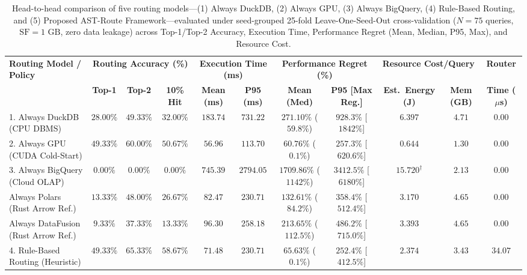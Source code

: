 \documentclass[10pt,a4paper]{article}
\begin{document}
\begin{table}[!t]
\centering
\caption{Head-to-head comparison of five routing models---(1) Always DuckDB, (2) Always GPU, (3) Always BigQuery, (4) Rule-Based Routing, and (5) Proposed AST-Route Framework---evaluated under seed-grouped 25-fold Leave-One-Seed-Out cross-validation ($N=75$ queries, $\text{SF}=1\text{ GB}$, zero data leakage) across Top-1/Top-2 Accuracy, Execution Time, Performance Regret (Mean, Median, P95, Max), and Resource Cost.}
\label{tab:routing_evaluation}\label{tab:query_routing}\label{tab:router_eval}
\scriptsize
\setlength{\tabcolsep}{3.2pt}
\renewcommand{\arraystretch}{1.12}
\begin{tabular}{@{}lcccccccccc@{}}
\toprule
\multirow{2}{*}{\textbf{Routing Model / Policy}} & \multicolumn{3}{c}{\textbf{Routing Accuracy (\%)}} & \multicolumn{2}{c}{\textbf{Execution Time (ms)}} & \multicolumn{2}{c}{\textbf{Performance Regret (\%)}} & \multicolumn{2}{c}{\textbf{Resource Cost/Query}} & \textbf{Router} \\
\cmidrule(lr){2-4} \cmidrule(lr){5-6} \cmidrule(lr){7-8} \cmidrule(lr){9-10} \cmidrule(lr){11-11}
 & \textbf{Top-1} & \textbf{Top-2} & \textbf{10\% Hit} & \textbf{Mean (ms)} & \textbf{P95 (ms)} & \textbf{Mean (Med)} & \textbf{P95 [Max Reg.]} & \textbf{Est.\ Energy (J)} & \textbf{Mem (GB)} & \textbf{Time ($\mu$s)} \\
\midrule
1. Always DuckDB (CPU DBMS) & $28.00\%$ & $49.33\%$ & $32.00\%$ & $183.74$ & $731.22$ & $271.10\%$ ($59.8\%$) & $928.3\%$ [$1842\%$] & $6.397$ & $4.71$ & $0.00$ \\
2. Always GPU (CUDA Cold-Start) & $49.33\%$ & $60.00\%$ & $50.67\%$ & $56.96$ & $113.70$ & $60.76\%$ ($0.1\%$) & $257.3\%$ [$620.6\%$] & $0.644$ & $1.30$ & $0.00$ \\
3. Always BigQuery (Cloud OLAP) & $0.00\%$ & $0.00\%$ & $0.00\%$ & $745.39$ & $2794.05$ & $1709.86\%$ ($1142\%$) & $3412.5\%$ [$6180\%$] & $15.720^{\dagger}$ & $2.13$ & $0.00$ \\
Always Polars (Rust Arrow Ref.) & $13.33\%$ & $48.00\%$ & $26.67\%$ & $82.47$ & $230.71$ & $132.61\%$ ($84.2\%$) & $358.4\%$ [$512.4\%$] & $3.170$ & $4.65$ & $0.00$ \\
Always DataFusion (Rust Arrow Ref.) & $9.33\%$ & $37.33\%$ & $13.33\%$ & $96.30$ & $258.18$ & $213.65\%$ ($112.5\%$) & $486.2\%$ [$715.0\%$] & $3.393$ & $4.65$ & $0.00$ \\
4. Rule-Based Routing (Heuristic) & $49.33\%$ & $65.33\%$ & $58.67\%$ & $71.48$ & $230.71$ & $65.63\%$ ($0.1\%$) & $252.4\%$ [$412.5\%$] & $2.374$ & $3.43$ & $34.07$ \\

\end{tabular}
\end{table}
\end{document}
